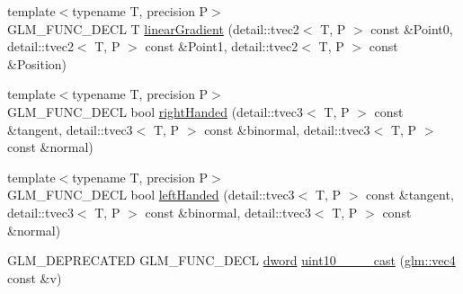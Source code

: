 \begin{CompactItemize}
\item 
{\footnotesize template$<$typename T, precision P$>$ }\\GLM\_\-FUNC\_\-DECL T \hyperlink{group__gtx__gradient__paint_g8d5ca6ccbfcaf23963228eac37543eeb}{linearGradient} (detail::tvec2$<$ T, P $>$ const \&Point0, detail::tvec2$<$ T, P $>$ const \&Point1, detail::tvec2$<$ T, P $>$ const \&Position)
\item 
{\footnotesize template$<$typename T, precision P$>$ }\\GLM\_\-FUNC\_\-DECL bool \hyperlink{group__gtx__handed__coordinate__space_g65f766ab3c8924b90eabc0e1ecf014d1}{rightHanded} (detail::tvec3$<$ T, P $>$ const \&tangent, detail::tvec3$<$ T, P $>$ const \&binormal, detail::tvec3$<$ T, P $>$ const \&normal)
\item 
{\footnotesize template$<$typename T, precision P$>$ }\\GLM\_\-FUNC\_\-DECL bool \hyperlink{group__gtx__handed__coordinate__space_g5613515e0fdb693d30e9e8db0aa17176}{leftHanded} (detail::tvec3$<$ T, P $>$ const \&tangent, detail::tvec3$<$ T, P $>$ const \&binormal, detail::tvec3$<$ T, P $>$ const \&normal)
\item 
\hypertarget{namespaceglm_c9ff752cfc08f478e19615228e3e19fc}{
GLM\_\-DEPRECATED GLM\_\-FUNC\_\-DECL \hyperlink{group__gtx__raw__data_g1fc2589df6d44e923cd1820cf14805cf}{dword} \hyperlink{namespaceglm_c9ff752cfc08f478e19615228e3e19fc}{uint10\_\_\_\_\-cast} (\hyperlink{group__core__types_g5881b1b022d7fd1b7218f5916532dd02}{glm::vec4} const \&v)}
\label{namespaceglm_c9ff752cfc08f478e19615228e3e19fc}


\end{CompactItemize}
